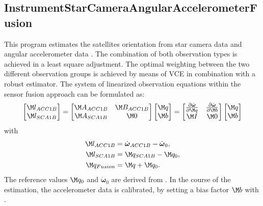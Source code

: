 \subsection{InstrumentStarCameraAngularAccelerometerFusion}\label{InstrumentStarCameraAngularAccelerometerFusion}
This program estimates the satellites orientation from star camera data
 and angular accelerometer data
. The combination of both observation types
is achieved in a least square adjustment. The optimal weighting between the two different
observation groups is achieved by means of VCE in combination with a robust estimator.
The system of linearized observation equations within the sensor fusion approach can be formulated as:
\begin{equation}
  \begin{bmatrix}
  \M l_{ACC1B}\\
  \M l_{SCA1B}
  \end{bmatrix}
  =
  \begin{bmatrix}
  \M A_{ACC1B} & \M B_{ACC1B}\\
  \M A_{SCA1B} & \M 0
  \end{bmatrix}
  \begin{bmatrix}
  \M q\\
  \M b
  \end{bmatrix}
  =
  \begin{bmatrix}
  \frac{\partial \dot{\boldsymbol{\omega}}}{\partial \M q} & \frac{\partial \dot{\boldsymbol{\omega}}}{\partial \M b}\\
  \M I & \M 0
  \end{bmatrix}
  \begin{bmatrix}
  \M q\\
  \M b
  \end{bmatrix}
\end{equation}
with
\begin{equation}\begin{split}
  \M l_{ACC1B}  &= \dot{\boldsymbol{\omega}}_{ACC1B} - \dot{\boldsymbol{\omega}}_{0}, \\
  \M l_{SCA1B}  &= \M q_{SCA1B} - \M q_{0}, \\
  \M q_{Fusion} &= \M q + \M q_{0}.
\end{split}\end{equation}
The reference values $\M q_{0}$ and $\dot{\boldsymbol{\omega}}_{0}$ are derived
from . In the course of the estimation,
the accelerometer data is calibrated, by setting a bias factor $\M b$ with .


